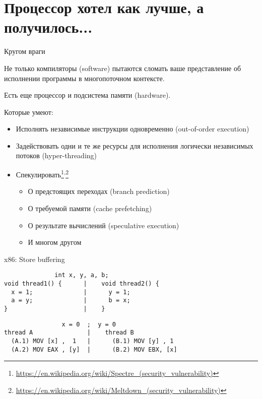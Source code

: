 
\section{Процессор хотел как лучше, а получилось...}
\showTOC

\begin{frame}{Кругом враги}

Не только компиляторы (software) пытаются сломать ваше представление об исполнении программы в многопоточном контексте. 

\pause
Есть еще процессор и подсистема памяти (hardware). 

\pause
Которые умеют:
\begin{itemize}
    \item Исполнять независимые инструкции одновременно (out-of-order execution)
    \item Задействовать одни и те же ресурсы для исполнения логически независимых потоков (hyper-threading)
    \item Спекулировать\footnote<3->{\tiny\url{https://en.wikipedia.org/wiki/Spectre_(security_vulnerability)}}\textsuperscript{,}\footnote<3->{\tiny\url{https://en.wikipedia.org/wiki/Meltdown_(security_vulnerability)}}
    \begin{itemize}
        \item О предстоящих переходах (branch prediction)
        \item О требуемой памяти (cache prefetching)
        \item О результате вычислений (speculative execution)
        \item И многом другом
    \end{itemize}
\end{itemize}

\end{frame}

\begin{frame}[fragile,t]{x86: Store buffering}

\begin{adjustbox}{width=\textwidth,height=2cm,keepaspectratio}
\begin{lstlisting}
              int x, y, a, b;
void thread1() {      |    void thread2() {                                   
  x = 1;              |      y = 1;                           
  a = y;              |      b = x;                           
}                     |    }                    
\end{lstlisting}
\end{adjustbox}

\pause

\begin{adjustbox}{width=\textwidth,height=2cm,keepaspectratio}
\begin{lstlisting}
                x = 0  ;  y = 0
thread A               |    thread B          
  (A.1) MOV [x] ,  1   |      (B.1) MOV [y] , 1  
  (A.2) MOV EAX , [y]  |      (B.2) MOV EBX, [x] 
\end{lstlisting}
\end{adjustbox}
\end{frame}


